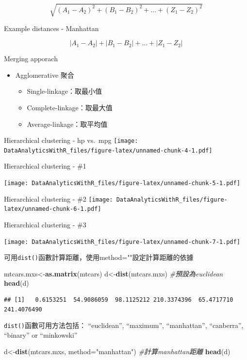 \documentclass[]{book}
\newenvironment{Shaded}{\begin{snugshade}}{\end{snugshade}}
\newcommand{\CommentTok}[1]{\textcolor[rgb]{0.56,0.35,0.01}{\textit{#1}}}
\newcommand{\DataTypeTok}[1]{\textcolor[rgb]{0.13,0.29,0.53}{#1}}
\newcommand{\KeywordTok}[1]{\textcolor[rgb]{0.13,0.29,0.53}{\textbf{#1}}}
\newcommand{\NormalTok}[1]{#1}
\newcommand{\StringTok}[1]{\textcolor[rgb]{0.31,0.60,0.02}{#1}}
\providecommand{\tightlist}{%
  \setlength{\itemsep}{0pt}\setlength{\parskip}{0pt}}
\begin{document}
\[\sqrt{(A_1-A_2)^2 + (B_1-B_2)^2 + \ldots + (Z_1-Z_2)^2}\]

Example distances - Manhattan

\[|A_1-A_2| + |B_1-B_2| + \ldots + |Z_1-Z_2|\]

Merging apporach

\begin{itemize}
\item
  Agglomerative 聚合

  \begin{itemize}
  \tightlist
  \item
    Single-linkage：取最小值
  \item
    Complete-linkage：取最大值
  \item
    Average-linkage：取平均值
  \end{itemize}
\end{itemize}

Hierarchical clustering - hp vs.~mpg
\texttt{[image: DataAnalyticsWithR\_files/figure-latex/unnamed-chunk-4-1.pdf]}

Hierarchical clustering - \#1

\texttt{[image: DataAnalyticsWithR\_files/figure-latex/unnamed-chunk-5-1.pdf]}

Hierarchical clustering - \#2
\texttt{[image: DataAnalyticsWithR\_files/figure-latex/unnamed-chunk-6-1.pdf]}

Hierarchical clustering - \#3

\texttt{[image: DataAnalyticsWithR\_files/figure-latex/unnamed-chunk-7-1.pdf]}

可用\texttt{dist()}函數計算距離，使用method=""設定計算距離的依據

\begin{Shaded}
\begin{Highlighting}[]
\NormalTok{mtcars.mxs<-}\KeywordTok{as.matrix}\NormalTok{(mtcars)}
\NormalTok{d<-}\KeywordTok{dist}\NormalTok{(mtcars.mxs) }\CommentTok{#預設為euclidean}
\KeywordTok{head}\NormalTok{(d)}
\end{Highlighting}
\end{Shaded}

\begin{verbatim}
## [1]   0.6153251  54.9086059  98.1125212 210.3374396  65.4717710 241.4076490
\end{verbatim}

\texttt{dist()}函數可用方法包括：
``euclidean'', ``maximum'', ``manhattan'', ``canberra'', ``binary'' or ``minkowski''

\begin{Shaded}
\begin{Highlighting}[]
\NormalTok{d<-}\KeywordTok{dist}\NormalTok{(mtcars.mxs, }\DataTypeTok{method=}\StringTok{"manhattan"}\NormalTok{) }\CommentTok{#計算manhattan距離}
\KeywordTok{head}\NormalTok{(d)}
\end{Highlighting}
\end{Shaded}
\end{document}
